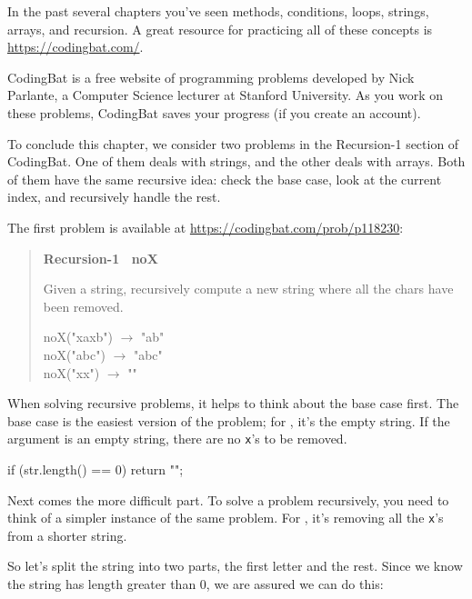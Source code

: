 In the past several chapters you've seen methods, conditions, loops, strings, arrays, and recursion.
A great resource for practicing all of these concepts is \url{https://codingbat.com/}.


CodingBat is a free website of programming problems developed by Nick Parlante, a Computer Science lecturer at Stanford University.
As you work on these problems, CodingBat saves your progress (if you create an account).

To conclude this chapter, we consider two problems in the {\sf Recursion-1} section of CodingBat.
One of them deals with strings, and the other deals with arrays.
Both of them have the same recursive idea: check the base case, look at the current index, and recursively handle the rest.

The first problem is available at \url{https://codingbat.com/prob/p118230}:

\begin{quote}
\textbf{Recursion-1 ~noX}

Given a string, recursively compute a new string where all the  chars have been removed.

\ttfamily
noX("xaxb") $\rightarrow$ "ab" \\
noX("abc") $\rightarrow$ "abc" \\
noX("xx") $\rightarrow$ ""
\end{quote}

When solving recursive problems, it helps to think about the base case first.
The base case is the easiest version of the problem; for , it's the empty string.
If the argument is an empty string, there are no {\tt x}'s to be removed.

\begin{code}
if (str.length() == 0) {
    return "";
}
\end{code}


Next comes the more difficult part.
To solve a problem recursively, you need to think of a simpler instance of the same problem.
For , it's removing all the {\tt x}'s from a shorter string.

So let's split the string into two parts, the first letter and the rest. Since we know the string has length greater than 0, we are assured we can do this:

